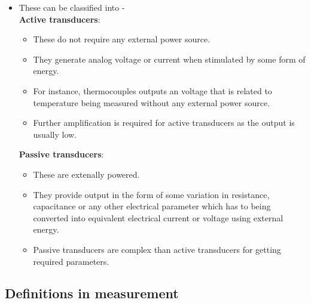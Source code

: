 \documentclass{article}
\begin{document}
\begin{itemize}
			\item These can be classified into - \\
			\textbf{Active transducers}: 
			\begin{itemize}
				\item These do not require any external power source. 
				\item They generate analog voltage or current when stimulated by some form of energy. 
				\item For instance, thermocouples outputs an voltage that is related to temperature being measured without any external power source. 
				\item Further amplification is required for active transducers as the output is usually low.
			\end{itemize}
			\textbf{Passive transducers}:
			\begin{itemize}
				\item These are extenally powered.
				\item They provide output in the form of some variation in resistance, capacitance or any other electrical parameter which has to being converted into equivalent electrical current or voltage using external energy. 
				\item Passive transducers are complex than active transducers for getting required parameters. 
			\end{itemize}

		\end{itemize}

	\subsection{Definitions in measurement}
\end{document}
